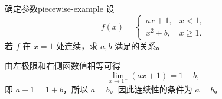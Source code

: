 \documentclass[UTF8,zihao=-4,scheme=chinese,fontset=none]{ctexart}
\begin{document}
\begin{example}{确定参数}{piecewise-example}
设
\[
f(x)=
\begin{cases}
ax+1, & x<1,\\
x^2+b, & x\ge 1.
\end{cases}
\]
若 $f$ 在 $x=1$ 处连续，求 $a,b$ 满足的关系。
\end{example}

\begin{solutionbox}
由左极限和右侧函数值相等可得
\[
  \lim_{x\to 1^-}(ax+1)=1+b,
\]
即 $a+1=1+b$，所以 $a=b$。因此连续性的条件为 $a=b$。
\end{solutionbox}

\end{document}
